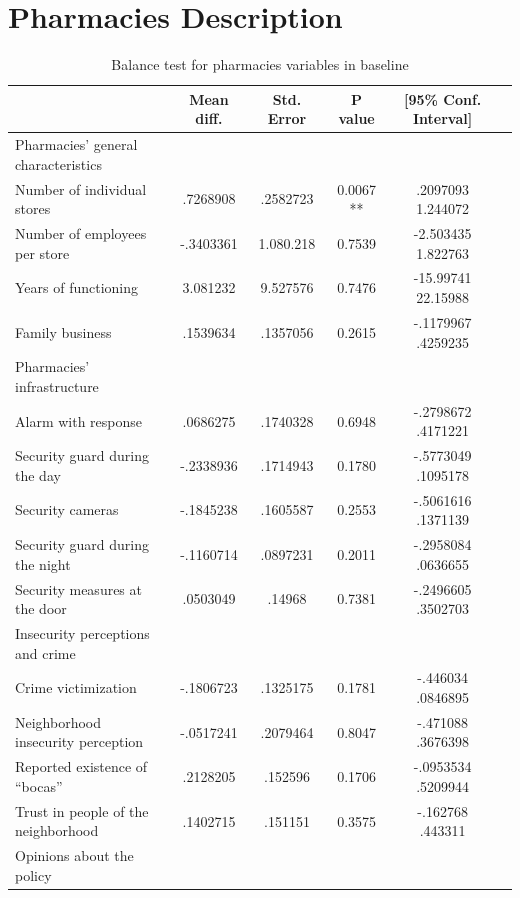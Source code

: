 \documentclass[11pt]{article}
\begin{document}
\section{Pharmacies Description}
\begin{table}
    \begin{small}
    \centering
    \caption{Balance test for pharmacies variables in baseline}
    \addtolength{\tabcolsep}{-3pt}
    \label{tab:pharmaciesperceptions}
    \begin{tabular}{lccccc}
&	Mean diff.	&	Std. Error	&	P value	&	[95\% Conf. Interval]\\	\hline
Pharmacies' general characteristics	&		&		&		&	\\	\hline
Number of individual stores 	&	.7268908 	&	.2582723	&	0.0067 **	&	.2097093    1.244072\\
Number of employees per store	&	-.3403361	&	1.080.218	&	 0.7539	&	-2.503435    1.822763\\
Years of functioning	&	3.081232	&	9.527576	&	0.7476	&	-15.99741    22.15988\\
Family business	&	.1539634 	&	 .1357056 	&	0.2615 	&	-.1179967 .4259235	\\  \hline
Pharmacies' infrastructure	&		&		&		&			\\	\hline
Alarm with response	&	.0686275	&	.1740328 	&	 0.6948	&	-.2798672    .4171221	\\
Security guard during the day 	&	-.2338936	&	 .1714943	&	0.1780 &	-.5773049    .1095178	\\
Security cameras 	&	 -.1845238	&	 .1605587	&	0.2553 	&	-.5061616    .1371139	\\
Security guard during the night	&	-.1160714 	&	 .0897231	&	0.2011 &	 -.2958084    .0636655	\\
Security measures at the door	&	.0503049	&	.14968	&	0.7381	&	-.2496605    .3502703	\\ \hline
Insecurity perceptions and crime	&		&		&		&	\\	\hline
Crime victimization 	&	-.1806723	&	.1325175 	&	0.1781	&	 -.446034    .0846895\\
Neighborhood insecurity perception	&	-.0517241	&	.2079464 	&	0.8047	&	-.471088    .3676398\\
Reported existence of ``bocas''	&	.2128205	&	.152596	&	0.1706 	&	-.0953534   	 .5209944	\\
Trust in people of the neighborhood	&	.1402715	&	.151151	&	0.3575	&	-.162768     .443311	\\ \hline
Opinions about the policy	&		&		&		&	\\	\hline

\end{tabular}
\end{small}
\end{table}
\end{document}
